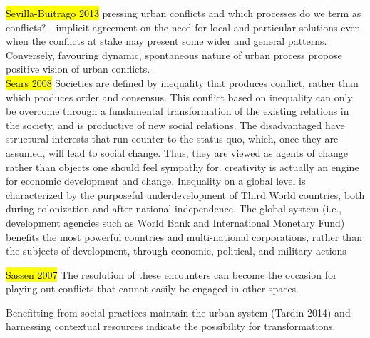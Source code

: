\documentclass[11pt]{report}
\begin{document}
\hl{Sevilla-Buitrago 2013}
pressing urban conflicts and which processes do we term as conflicts? - implicit agreement on the need for local and particular solutions even when the conflicts at stake may present some wider and general patterns.
Conversely, favouring dynamic, spontaneous nature of urban process propose positive vision of urban conflicts.
\\
\hl{Sears 2008}
Societies are defined by inequality that produces conflict, rather than which produces order and consensus. This conflict based on inequality can only be overcome through a fundamental transformation of the existing relations in the society, and is productive of new social relations.
The disadvantaged have structural interests that run counter to the status quo, which, once they are assumed, will lead to social change. Thus, they are viewed as agents of change rather than objects one should feel sympathy for.
creativity is actually an engine for economic development and change.
Inequality on a global level is characterized by the purposeful underdevelopment of Third World countries, both during colonization and after national independence. The global system (i.e., development agencies such as World Bank and International Monetary Fund) benefits the most powerful countries and multi-national corporations, rather than the subjects of development, through economic, political, and military actions

\hl{Sassen 2007}
The resolution of these encounters can become the occasion for playing out conflicts that cannot easily be engaged in other spaces.

Benefitting from social practices maintain the urban system (Tardin 2014) and harnessing contextual resources indicate the possibility for transformations.
\end{document}

